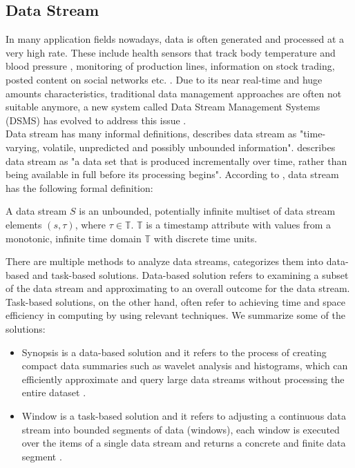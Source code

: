 \documentclass[runningheads]{llncs}
\begin{document}
\subsection{Data Stream}
In many application fields nowadays, data is often generated and processed at a very high rate. These include health sensors that track body temperature and blood pressure \cite{Geisler13},
monitoring of production lines, information on stock trading, posted content on social networks etc. \cite{Geisler16}. Due to its near real-time and huge amounts characteristics, traditional data management
approaches are often not suitable anymore, a new system called Data Stream Management Systems (DSMS) has evolved to address this issue \cite{Geisler16}. \\
\noindent \newline
Data stream has many informal definitions, \cite{Patro06} describes data stream as "time-varying, volatile, unpredicted and possibly unbounded information". \cite{Golab03} describes data stream as
"a data set that is produced incrementally over time, rather than being available in full before its processing begins". According to \cite{Geisler13}, data stream has the following formal definition:
\begin{definition}
  A data stream $S$ is an unbounded, potentially infinite multiset of data stream elements $(s,\tau)$, where $\tau \in \mathbb{T}$. $\mathbb{T}$ is a timestamp attribute with values from a monotonic, infinite time domain $\mathbb{T}$ with discrete time units.
\end{definition} 
\noindent
There are multiple methods to analyze data streams, \cite{Gaber05} categorizes them into data-based and task-based solutions. Data-based solution refers to examining a subset of the data stream and approximating to an
overall outcome for the data stream. Task-based solutions, on the other hand, often refer to achieving time and space efficiency in computing by using relevant techniques. We summarize some of the solutions:
\begin{itemize}
  \item Synopsis is a data-based solution and it refers to the process of creating compact data summaries such as wavelet analysis and histograms, which can efficiently approximate and query large data streams without processing the entire dataset \cite{Gaber05}.
  \item Window is a task-based solution and it refers to adjusting a continuous data stream into bounded segments of data (windows), each window is executed over the items of a single data stream and returns a concrete and finite data segment \cite{Patro06}.
\end{itemize}
\end{document}
